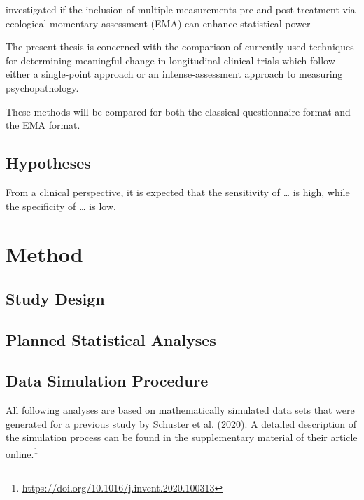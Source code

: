 \documentclass[12pt,twoside]{reedthesis}
\begin{document}
\par

investigated if the inclusion of multiple measurements pre and post treatment via ecological momentary assessment (EMA) can enhance statistical power

The present thesis is concerned with the comparison of currently used techniques for determining meaningful change in longitudinal clinical trials which follow either a single-point approach or an intense-assessment approach to measuring psychopathology.

\par

These methods will be compared for both the classical questionnaire format and the EMA format.

\hypertarget{hypotheses}{%
\section{Hypotheses}\label{hypotheses}}

From a clinical perspective, it is expected that the sensitivity of \emph{\ldots{}} is high, while the specificity of \emph{\ldots{}} is low.

\hypertarget{method}{%
\chapter{Method}\label{method}}

\hypertarget{study-design}{%
\section{Study Design}\label{study-design}}

\hypertarget{planned-statistical-analyses}{%
\section{Planned Statistical Analyses}\label{planned-statistical-analyses}}

\hypertarget{data-simulation-procedure}{%
\section{Data Simulation Procedure}\label{data-simulation-procedure}}

All following analyses are based on mathematically simulated data sets that were generated for a previous study by Schuster et al. (2020). A detailed description of the simulation process can be found in the supplementary material of their article online.\footnote{\url{https://doi.org/10.1016/j.invent.2020.100313}}
\end{document}
